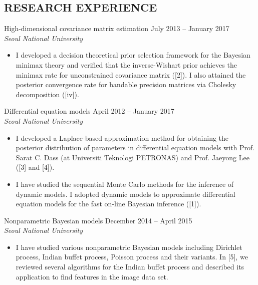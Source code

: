 \documentclass[margin, 10pt]{res} %
\begin{document}
\begin{resume}
\section{\sf RESEARCH EXPERIENCE}


High-dimensional covariance matrix estimation    \hfill July 2013 -- January 2017\\
{\sl Seoul National University} 
\begin{itemize} 
	\item I developed a decision theoretical prior selection framework for the Bayesian minimax theory and verified that the inverse-Wishart prior achieves the minimax rate for unconstrained covariance matrix ([2]). I also attained the posterior convergence rate for bandable precision matrices via Cholesky decomposition ([iv]). 
\end{itemize}

Differential equation models  \hfill April 2012 -- January 2017 \\
{\sl Seoul National University}  
\begin{itemize}
	\item I developed a Laplace-based approximation method for obtaining the posterior distribution of parameters in differential equation models with Prof. Sarat C. Dass (at Universiti Teknologi PETRONAS) and Prof. Jaeyong Lee ([3] and [4]).
	\item I have studied the sequential Monte Carlo methods for the inference of dynamic models. I adopted dynamic models to approximate differential equation models for the fast on-line Bayesian inference ([1]). 
\end{itemize}

Nonparametric Bayesian models	\hfill December 2014 -- April 2015\\
{\sl Seoul National University}   
\begin{itemize}
	\item I have studied various nonparametric Bayesian models including Dirichlet process, Indian buffet process, Poisson process and their variants. In [5], we reviewed several algorithms for the Indian buffet process and described its application to find features in the image data set.
\end{itemize}

\vspace{.2cm}
 

\end{resume}
\end{document}
